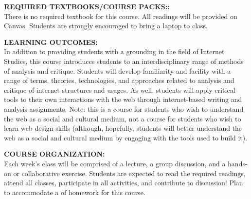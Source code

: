 \documentclass[10pt]{article}
\begin{document}

\textbf{REQUIRED TEXTBOOKS/COURSE PACKS::}\\
There is no required textbook for this course. All readings will be provided on Canvas. Students are strongly encouraged to bring a laptop to class. 

\textbf{LEARNING OUTCOMES:}\\
In addition to providing students with a grounding in the field of Internet Studies, this course introduces students to an interdisciplinary range of methods of analysis and critique. Students will develop familiarity and facility with a range of terms, theories, technologies, and approaches related to analysis and critique of internet structures and usages. As well, students will apply critical tools to their own interactions with the web through internet-based writing and analysis assignments. Note: this is a course for students who wish to understand the web as a social and cultural medium, not a course for students who wish to learn web design skills (although, hopefully, students will better understand the web as a social and cultural medium by engaging with the tools used to build it). 

\textbf{COURSE ORGANIZATION:}\\
Each week's class will be comprised of a lecture, a group discussion, and a hands-on or collaborative exercise. Students are expected to read the required readings, attend all classes, participate in all activities, and contribute to discussion! Plan to accommodate a \underline{} of homework for this course. 
\end{document}
